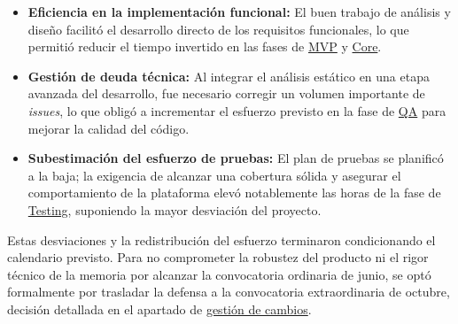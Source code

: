 \begin{itemize}
    \item \textbf{Eficiencia en la implementación funcional:} El buen trabajo de análisis y diseño facilitó el desarrollo directo de los requisitos funcionales, lo que permitió reducir el tiempo invertido en las fases de \hyperref[fase:mvp]{MVP} y \hyperref[fase:core]{Core}.
    \item \textbf{Gestión de deuda técnica:} Al integrar el análisis estático en una etapa avanzada del desarrollo, fue necesario corregir un volumen importante de \textit{issues}, lo que obligó a incrementar el esfuerzo previsto en la fase de \hyperref[fase:qa]{QA} para mejorar la calidad del código.
    \item \textbf{Subestimación del esfuerzo de pruebas:} El plan de pruebas se planificó a la baja; la exigencia de alcanzar una cobertura sólida y asegurar el comportamiento de la plataforma elevó notablemente las horas de la fase de \hyperref[fase:testing]{Testing}, suponiendo la mayor desviación del proyecto.
\end{itemize}

Estas desviaciones y la redistribución del esfuerzo terminaron condicionando el calendario previsto. Para no comprometer la robustez del producto ni el rigor técnico de la memoria por alcanzar la convocatoria ordinaria de junio, se optó formalmente por trasladar la defensa a la convocatoria extraordinaria de octubre, decisión detallada en el apartado de \hyperref[sec:desviaciones_y_gestion_cambios]{gestión de cambios}.

